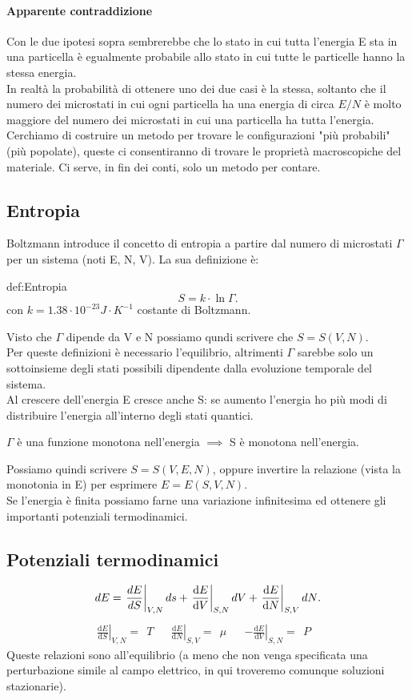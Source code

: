 \paragraph{Apparente contraddizione} %
Con le due ipotesi sopra sembrerebbe che lo stato in cui tutta l'energia E sta in una particella è egualmente probabile allo stato in cui tutte le particelle hanno la stessa energia. \\
In realtà la probabilità di ottenere uno dei due casi è la stessa, soltanto che il numero dei microstati in cui ogni particella ha una energia di circa $E / N$ è molto maggiore del numero dei microstati in cui una particella ha tutta l'energia.\\
Cerchiamo di costruire un metodo per trovare le configurazioni "più probabili" (più popolate), queste ci consentiranno di trovare le proprietà macroscopiche del materiale. Ci serve, in fin dei conti, solo un metodo per contare. 
\subsection{Entropia}%
Boltzmann introduce il concetto di entropia a partire dal numero di microstati $\Gamma$ per un sistema (noti E, N, V). La sua definizione è:
\begin{defn}[Entropia]{def:Entropia}
	\[
	S = k\cdot \ln\Gamma
	.\] 
	con $k = 1.38 \cdot 10^{-23} J\cdot K^{-1}$ costante di Boltzmann.\\
\end{defn}
Visto che $\Gamma$ dipende da V e N possiamo qundi scrivere che $S = S\left( V, N \right)$. \\
Per queste definizioni è necessario l'equilibrio, altrimenti $\Gamma$ sarebbe solo un sottoinsieme degli stati possibili dipendente dalla evoluzione temporale del sistema.\\
Al crescere dell'energia E cresce anche S: se aumento l'energia ho più modi di distribuire l'energia all'interno degli stati quantici. 
\begin{center}
$\Gamma$ è una funzione monotona nell'energia $\implies$ S è monotona nell'energia.
\end{center}
Possiamo quindi scrivere $S = S(V,E,N)$, oppure invertire la relazione (vista la monotonia in E) per esprimere $E = E(S,V,N)$.\\ 
Se l'energia è finita possiamo farne una variazione infinitesima ed ottenere gli importanti potenziali termodinamici.
\subsection{Potenziali termodinamici}%
\[
	dE = \left.\frac{dE}{dS}\right|_{V,N}ds + \left.\frac{\mbox{d} E}{\mbox{d} V} \right|_{S,N}dV + \left.\frac{\mbox{d} E}{\mbox{d} N} \right|_{S,V}dN\\
.\]
\begin{align}
	\left.\frac{\mbox{d} E}{\mbox{d} S}\right|_{V,N}= \ \ T&
	&\left.\frac{\mbox{d} E}{\mbox{d} N}\right|_{S,V} = \ \ \mu& 
	&\left.-\frac{\mbox{d} E}{\mbox{d} V} \right|_{S,N} = \ \ P&
\end{align}
Queste relazioni sono all'equilibrio (a meno che non venga specificata una perturbazione simile al campo elettrico, in qui troveremo comunque soluzioni stazionarie).
